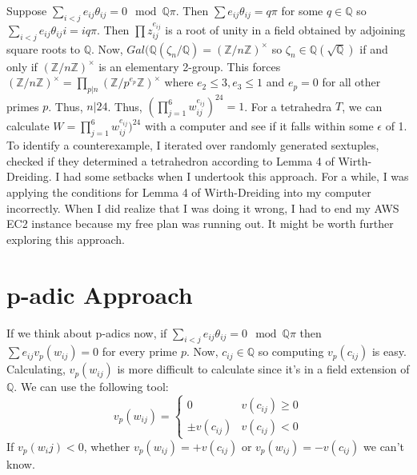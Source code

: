 \documentclass[12pt,reqno]{amsart}
\newcommand{\Q}{\mathbb{Q}}
\newcommand{\Z}{\mathbb{Z}}
\theoremstyle{definition}
\theoremstyle{remark}
\begin{document}
Suppose $\sum_{i<j} e_{ij}\theta_{ij}=0\mod{\Q\pi}$. Then $\sum e_{ij}\theta_{ij}=q\pi$
for some $q\in \Q$ so $\sum_{i<j} e_{ij}\theta_{ij} i=iq\pi$. Then $\prod z_{ij}^{e_{ij}}$ is a root
of unity in a field obtained by adjoining square roots to $\Q$. Now,
$Gal(\Q(\zeta_n/\Q)=(\Z/n\Z)^\times$ so $\zeta_n\in \Q(\sqrt{\Q})$
if and only if $(\Z/n\Z)^\times$ 
is an elementary 2-group. This forces $(\Z/n\Z)^\times=\prod_{p|n}(\Z/p^{e_p}\Z)^\times$
where $e_2\leq 3,e_3\leq 1$ and $e_p=0$ for all other primes $p$. Thus,
$n|24$. Thus, $(\prod_{j=1}^6 w_{ij}^{e_{ij}})^{24}=1$. For a tetrahedra $T$, we can 
calculate $W=\prod_{j=1}^6 w_{ij}^{e_{ij}})^{24}$ with a computer and see if it falls
within some $\epsilon$ of 1. To identify a counterexample, I iterated over randomly generated
sextuples, checked if they determined a tetrahedron according to Lemma 4 of Wirth-Dreiding.
I had some setbacks when I undertook this approach. For a while, I was applying the conditions
for Lemma 4 of Wirth-Dreiding into my computer incorrectly. When I did realize that I was
doing it wrong, I had to end my AWS EC2 instance because my free plan was running out.
It might be worth further exploring this approach.
\section{p-adic Approach}
If we think about p-adics now, if $\sum_{i<j}e_{ij}\theta_{ij}=0\mod{\Q\pi}$ then $\sum e_{ij}v_p(w_{ij})=0$
for every prime $p$. Now, $c_{ij}\in \Q$ so 
computing $v_p(c_{ij})$ is easy. Calculating, $v_p(w_{ij})$
is more difficult to calculate since it's in a field extension of $\Q$.
We can use the following tool:
$$
v_p(w_{ij})=\begin{cases}
  0&v(c_{ij})\geq 0\\
  \pm v(c_{ij})&v(c_{ij})<0
\end{cases}
$$
If $v_p(w_ij)<0$, whether $v_p(w_{ij})=+v(c_{ij})$ or $v_p(w_{ij})=-v(c_{ij})$ we can't know.
\end{document}
